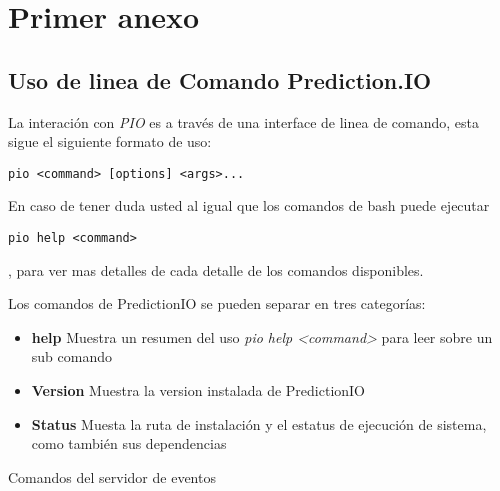 \chapter{Primer anexo}
\label{ch:anexo-a}


\section{Uso de linea de Comando Prediction.IO}


La interación con \emph{PIO} es a través de una interface de linea de comando, esta sigue el siguiente formato de uso:

 

\begin{lstlisting}[frame=single,basicstyle=\ttfamily\tiny,]
  pio <command> [options] <args>...
\end{lstlisting}



En caso de tener duda usted al igual que los comandos de bash puede ejecutar

\begin{lstlisting}[frame=single,basicstyle=\ttfamily\tiny,]
pio help <command> 
\end{lstlisting}, para ver mas detalles de cada detalle de los comandos disponibles.


Los comandos de PredictionIO se pueden separar en tres categorías:

\begin{itemize}
	\item \textbf{help} Muestra un resumen del uso  \emph{pio help <command>} para leer sobre un sub comando
	
	\item \textbf{Version} Muestra la version instalada de PredictionIO
	
	
	\item \textbf{Status} Muesta la ruta de instalación y el estatus de ejecución de sistema, como también sus dependencias
	
\end{itemize}

Comandos del servidor de eventos



